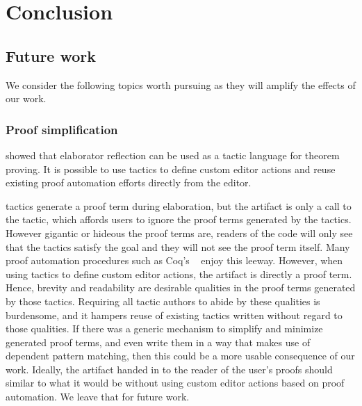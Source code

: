 \section{Conclusion}\label{sec:conclusion}

\subsection{Future work}

We consider the following topics worth pursuing as they will amplify the effects
of our work.

\subsubsection{Proof simplification}

\citet{elabref} showed that elaborator reflection can be used as a tactic
language for theorem proving. It is possible to use \Elab{} tactics to define
custom editor actions and reuse existing proof automation efforts directly from
the editor.

\Elab{} tactics generate a proof term during elaboration, but the artifact is
only a call to the tactic, which affords users to ignore the proof terms
generated by the tactics. However gigantic or hideous the proof terms are,
readers of the code will only see that the tactics satisfy the goal and they
will not see the proof term itself. Many proof automation procedures such as
Coq's ~\cite{omega} enjoy this leeway.
However, when using \Elab{} tactics to
define custom editor actions, the artifact is directly a proof term. Hence,
brevity and readability are desirable qualities in the proof terms generated by
those tactics.
Requiring all tactic authors to abide by these qualities is burdensome, and it
hampers reuse of existing tactics written without regard to those qualities.
If there was a generic mechanism to simplify and minimize
generated proof terms, and even write them in a way that makes use of dependent
pattern matching, then this could be a more usable consequence of our work.
Ideally, the artifact handed in to the reader of the user's proofs should
similar to what it would be without using custom editor actions based on proof
automation.  We leave that for future work.


